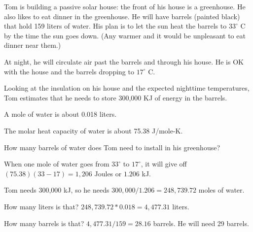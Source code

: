 \begin{Exercise}[title={Using Water For Thermal Energy Storage}, label=waterthermal]
Tom is building a passive solar house:  the front of his house is a greenhouse.  He also likes to 
eat dinner in the greenhouse.  He will have barrels (painted black) that hold 159 liters of water.  His plan is to let the sun heat the barrels to $33^\circ$ C by the time the sun goes down.  (Any warmer and it would be unpleasant to eat dinner near them.)

At night, he will circulate air past the barrels and through his house.  He is OK with the house and the barrels dropping to $17^\circ$ C.

Looking at the insulation on his house and the expected nighttime temperatures,  Tom estimates that he needs to store 300,000 KJ of energy in the barrels.

A mole of water is about 0.018 liters.

The molar heat capacity of water is about 75.38 J/mole-K.

How many barrels of water does Tom need to install in his greenhouse?

\end{Exercise}
\begin{Answer}[ref=waterthermal] 

When one mole of water goes from $33^\circ$ to $17^\circ$,  it will give off $(75.38)(33-17) = 1,206$ Joules or $1.206$ kJ. 

Tom needs 300,000 kJ,  so he needs $300,000/1.206 =   248,739.72$ moles of water.

How many liters is that?  $248,739.72 * 0.018 = 4,477.31$ liters.

How many barrels is that? $4,477.31 / 159 = 28.16$ barrels.  He will need 29 barrels.
  
\end{Answer}


